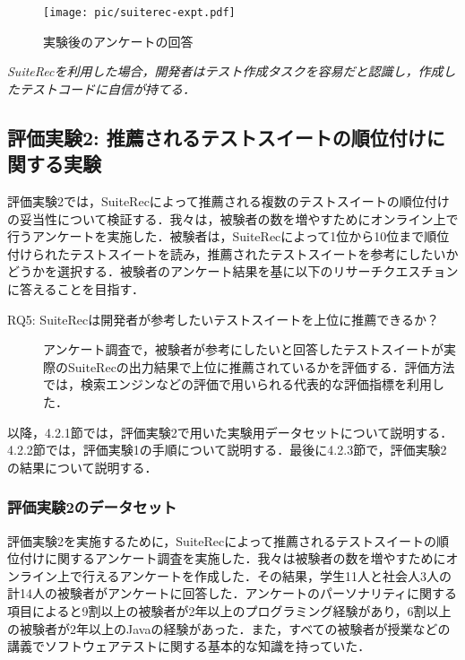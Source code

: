 \documentclass[12pt]{jarticle} %
\begin{document}
\begin{figure}[htbp]
  \begin{center}
   \texttt{[image: pic/suiterec-expt.pdf]}
  \caption{実験後のアンケートの回答}
  \label{QA}
  \end{center}
\end{figure}

\begin{breakbox}
\textit{{\sf SuiteRec}を利用した場合，開発者はテスト作成タスクを容易だと認識し，作成したテストコードに自信が持てる．}
\end{breakbox}

\subsection{評価実験2: 推薦されるテストスイートの順位付けに関する実験}
評価実験2では，{\sf SuiteRec}によって推薦される複数のテストスイートの順位付けの妥当性について検証する．我々は，被験者の数を増やすためにオンライン上で行うアンケートを実施した．被験者は，{\sf SuiteRec}によって1位から10位まで順位付けられたテストスイートを読み，推薦されたテストスイートを参考にしたいかどうかを選択する．被験者のアンケート結果を基に以下のリサーチクエスチョンに答えることを目指す．

\begin{description}
\item[RQ5: SuiteRecは開発者が参考したいテストスイートを上位に推薦できるか？]
アンケート調査で，被験者が参考にしたいと回答したテストスイートが実際の{\sf SuiteRec}の出力結果で上位に推薦されているかを評価する．評価方法では，検索エンジンなどの評価で用いられる代表的な評価指標を利用した．
\end{description}

以降，4.2.1節では，評価実験2で用いた実験用データセットについて説明する．4.2.2節では，評価実験1の手順について説明する．最後に4.2.3節で，評価実験2の結果について説明する．

\subsubsection{評価実験2のデータセット}

評価実験2を実施するために，{\sf SuiteRec}によって推薦されるテストスイートの順位付けに関するアンケート調査を実施した．我々は被験者の数を増やすためにオンライン上で行えるアンケートを作成した．その結果，学生11人と社会人3人の計14人の被験者がアンケートに回答した．アンケートのパーソナリティに関する項目によると9割以上の被験者が2年以上のプログラミング経験があり，6割以上の被験者が2年以上のJavaの経験があった．また，すべての被験者が授業などの講義でソフトウェアテストに関する基本的な知識を持っていた．
\end{document}
